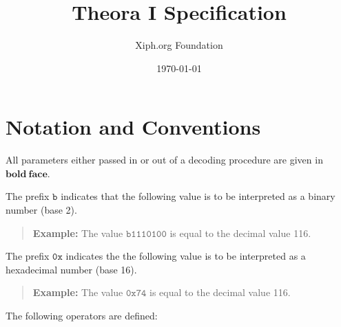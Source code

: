 \documentclass[11pt,letterpaper]{book}
\title{Theora I Specification}
\author{Xiph.org Foundation}
\date{\today}
\newcommand{\bitvar}[1]{\ensuremath{\mathbf{\bm #1}}}
\newcommand{\bin}[1]{\ensuremath{\mathtt{b#1}}}
\newcommand{\hex}[1]{\ensuremath{\mathtt{0x#1}}}
\numberwithin{equation}{chapter}
\numberwithin{figure}{chapter}
\numberwithin{table}{chapter}
\begin{document}
\frontmatter

\begin{titlepage}
\maketitle
\end{titlepage}
\thispagestyle{empty}
\cleardoublepage


\thispagestyle{plain}
\tableofcontents
\cleardoublepage

\thispagestyle{plain}
\listoffigures
\cleardoublepage

\thispagestyle{plain}
\listoftables
\cleardoublepage

\thispagestyle{plain}
\chapter*{Notation and Conventions}

All parameters either passed in or out of a decoding procedure are given in
 \bitvar{bold\ face}.

The prefix \bin{} indicates that the following value is to be interpreted as a
 binary number (base 2).
\begin{verse}
{\bf Example:} The value \bin{1110100} is equal to the decimal value 116.
\end{verse}

The prefix \hex{} indicates the the following value is to be interpreted as a
 hexadecimal number (base 16).
\begin{verse}
{\bf Example:} The value \hex{74} is equal to the decimal value 116.
\end{verse}

The following operators are defined:
\end{document}
